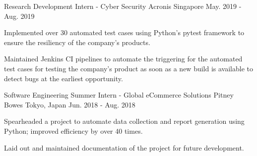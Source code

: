 \begin{cventries}
  \cventry
    {Research Development Intern - Cyber Security} %
    {Acronis} %
    {Singapore} %
    {May. 2019 - Aug. 2019} %
    {
      \begin{cvitems} %
        \item {Implemented over 30 automated test cases using Python’s pytest framework to ensure the resiliency of the company’s products.}
        \item {Maintained Jenkins CI pipelines to automate the triggering for the automated test cases for testing the company’s product as soon as a new build is available to detect bugs at the earliest opportunity.}
      \end{cvitems}
    }

  \cventry
    {Software Engineering Summer Intern - Global eCommerce Solutions} %
    {Pitney Bowes} %
    {Tokyo, Japan} %
    {Jun. 2018 - Aug. 2018} %
    {
      \begin{cvitems} %
        \item {Spearheaded a project to automate data collection and report generation using Python; improved efficiency by over 40 times.}
        \item {Laid out and maintained documentation of the project for future development.}
      \end{cvitems}
    }

\end{cventries}
